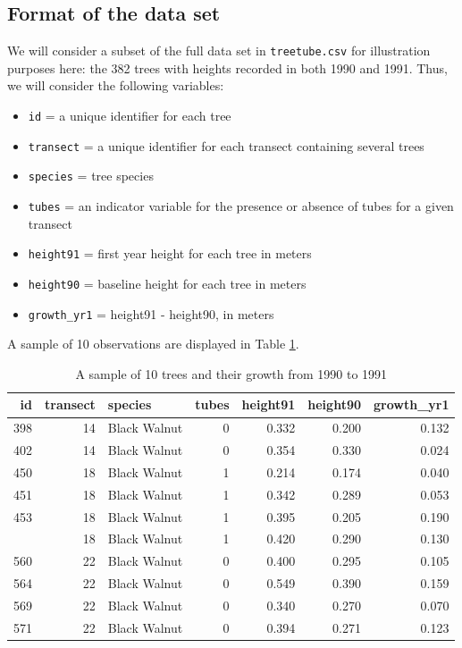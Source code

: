 \documentclass[
]{krantz}
\providecommand{\tightlist}{%
  \setlength{\itemsep}{0pt}\setlength{\parskip}{0pt}}
\begin{document}
\hypertarget{format-of-the-data-set}{%
\subsection{Format of the data set}\label{format-of-the-data-set}}

We will consider a subset of the full data set in \texttt{treetube.csv} for illustration purposes here: the 382 trees with heights recorded in both 1990 and 1991. Thus, we will consider the following variables:

\begin{itemize}
\tightlist
\item
  \texttt{id} = a unique identifier for each tree
\item
  \texttt{transect} = a unique identifier for each transect containing several trees
\item
  \texttt{species} = tree species
\item
  \texttt{tubes} = an indicator variable for the presence or absence of tubes for a given transect
\item
  \texttt{height91} = first year height for each tree in meters
\item
  \texttt{height90} = baseline height for each tree in meters
\item
  \texttt{growth\_yr1} = height91 - height90, in meters
\end{itemize}

A sample of 10 observations are displayed in Table \ref{tab:treeTubeTab}.

\begin{table}

\caption{\label{tab:treeTubeTab}A sample of 10 trees and their growth from 1990 to 1991}
\centering
\begin{tabular}[t]{rrlrrrr}
\toprule
id & transect & species & tubes & height91 & height90 & growth\_yr1\\
\midrule
398 & 14 & Black Walnut & 0 & 0.332 & 0.200 & 0.132\\
402 & 14 & Black Walnut & 0 & 0.354 & 0.330 & 0.024\\
450 & 18 & Black Walnut & 1 & 0.214 & 0.174 & 0.040\\
451 & 18 & Black Walnut & 1 & 0.342 & 0.289 & 0.053\\
453 & 18 & Black Walnut & 1 & 0.395 & 0.205 & 0.190\\
\addlinespace
458 & 18 & Black Walnut & 1 & 0.420 & 0.290 & 0.130\\
560 & 22 & Black Walnut & 0 & 0.400 & 0.295 & 0.105\\
564 & 22 & Black Walnut & 0 & 0.549 & 0.390 & 0.159\\
569 & 22 & Black Walnut & 0 & 0.340 & 0.270 & 0.070\\
571 & 22 & Black Walnut & 0 & 0.394 & 0.271 & 0.123\\
\bottomrule
\end{tabular}
\end{table}
\end{document}
